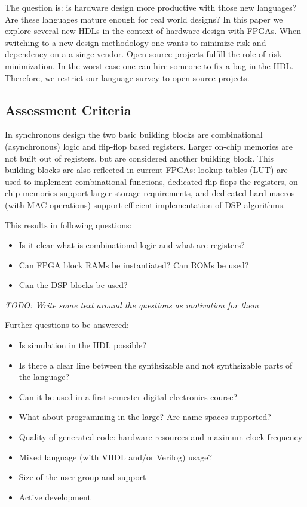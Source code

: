 \documentclass[10pt, technote, draftcls, onecolumn]{IEEEtran}
\newcommand{\todo}[1]{{\emph{TODO: #1}}}
\begin{document}
The question is: is hardware design more productive with those new
languages? Are these languages mature enough for real world designs?
In this paper we explore several new HDLs in the context of hardware
design with FPGAs. When switching to a new design methodology one
wants to minimize risk and dependency on a a singe vendor. Open source
projects fulfill the role of risk minimization. In the worst case one can hire
someone to fix a bug in the HDL. Therefore, we restrict our language survey
to open-source projects.

\subsection{Assessment Criteria}


In synchronous design the two basic building blocks are combinational
(asynchronous) logic and flip-flop based registers. Larger on-chip
memories are not built out of registers, but are considered another building
block. This building blocks are also reflected in current FPGAs: lookup tables
(LUT) are used to implement combinational functions, dedicated flip-flops
the registers, on-chip memories support larger storage requirements,
and dedicated hard macros (with MAC operations) support efficient
implementation of DSP algorithms.

This results in following questions:
\begin{itemize}
\item Is it clear what is combinational logic and what are registers?
\item Can FPGA block RAMs be instantiated? Can ROMs be used?
\item Can the DSP blocks be used?
\end{itemize}

\todo{Write some text around the questions as motivation for them}

Further questions to be answered:

\begin{itemize}
\item Is simulation in the HDL possible?
\item Is there a clear line between the synthsizable  and not synthsizable parts of the language?
\item Can it be used in a first semester digital electronics course?
\item What about programming in the large? Are name spaces supported?
\item Quality of generated code: hardware resources and maximum clock frequency
\item Mixed language (with VHDL and/or Verilog) usage?
\item Size of the user group and support
\item Active development
\end{itemize}
\end{document}
